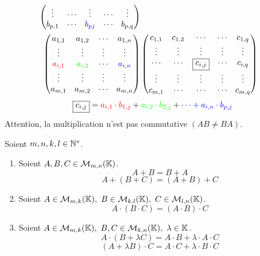 \begin{definition}
\begin{enumerate}
\begin{align*}
\begin{pmatrix}
                \vdots & \cdots & \vdots & \cdots & \vdots \\
                b_{p,1} & \cdots & \color{blue}b_{pj} & \cdots & b_{p,q}
            \end{pmatrix}
            \\
            \begin{pmatrix}
                a_{1,1} & a_{1,2} & \cdots & a_{1,n} \\ 
                \vdots & \vdots & \vdots & \vdots \\
                \color{red}a_{i,1} & \color{green}a_{i,2} & \cdots & \color{blue}a_{i,n} \\ 
                \vdots & \vdots & \vdots & \vdots \\
                a_{m,1} & a_{m,2} & \cdots & a_{m,n}
            \end{pmatrix}
            &\begin{pmatrix}
                c_{1,1} & c_{1,2} & \cdots & \cdots & c_{1,q} \\
                \vdots & \vdots & \vdots & \vdots & \vdots \\
                \cdots & \cdots & \boxed{c_{i,j}} & \cdots & c_{i,q} \\
                \vdots & \vdots & \vdots & \vdots & \vdots \\
                c_{m,1} & \cdots & \cdots & \cdots & c_{m,q}
            \end{pmatrix}
        \end{align*}
        \[ \boxed{c_{i,j}} = \color{red}a_{i,1} \cdot b_{1,j} \color{black}+ \color{green} a_{i,2} \cdot b_{2,j} \color{black}+ \color{blue}\cdots + a_{i,n} \cdot b_{p,j} \]
		Attention, la multiplication n'est pas commutative $(AB \neq BA)$.
	\end{enumerate}
\end{definition}

\begin{proposition}
	Soient $m, n, k, l \in \mathbb{N}^*$.
	\begin{enumerate}
		\item Soient $A, B, C \in \mathcal{M}_{m,n} (\mathbb{K})$.
		\[A + B = B + A\]
		\[A + (B + C) = (A + B) + C\]
		\item Soient $A \in \mathcal{M}_{m, k}(\K),\ B \in \mathcal{M}_{k, l}(\K),\ C \in \mathcal{M}_{l, n}(\K)$.
		\[A \cdot (B \cdot C) = (A \cdot B) \cdot C\]
		\item Soient $A \in \mathcal{M}_{m, k}(\K),\ B, C \in \mathcal{M}_{k, n}(\K),\ \lambda \in \K$.
		\[A \cdot (B + \lambda C) = A \cdot B + \lambda \cdot A \cdot C\]
		\[(A + \lambda B) \cdot C = A \cdot C + \lambda \cdot B \cdot C\]
	\end{enumerate}
\end{proposition}

